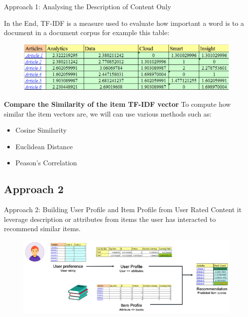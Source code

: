 \begin{frame}{Approach 1: Analysing the Description of Content Only}
\begin{enumerate}
\begin{figure}
        \end{figure}
    \end{enumerate}
    In the End, TF-IDF is a measure used to evaluate how important a word is to a document in a document corpus for example this table:
    \begin{figure}
        \includegraphics[scale=0.6]{figures/id-idtf.PNG}
    \end{figure}
    \textbf{Compare the Similarity of the item TF-IDF vector}
    To compute how similar the item vectors are, we will can use various methods such as:
    \begin{itemize}
        \item Cosine Similarity
        \item Euclidean Distance
        \item Peason’s Correlation
    \end{itemize}
\end{frame}

\subsection{Approach 2}
\begin{frame}{Approach 2: Building User Profile and Item Profile from User Rated Content}
it leverage description or attributes from items the user has interacted to recommend similar items. 
\begin{figure}
    \includegraphics[scale=0.45]{figures/approach2.png}
\end{figure}
\end{frame}

